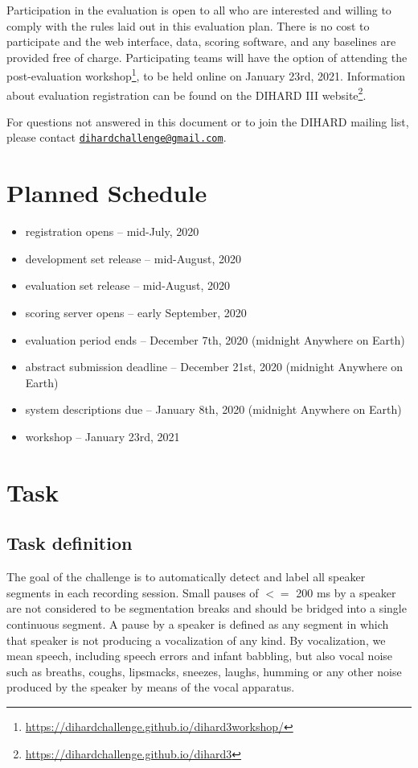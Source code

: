 \documentclass{article}
\newcommand{\email}[1]{\href{mailto:#1}{\nolinkurl{#1}}}
\begin{document}
Participation in the evaluation is open to all who are interested and willing to comply with the rules laid out in this evaluation plan. There is no cost to participate and the web interface, data, scoring software, and any baselines are provided free of charge. Participating teams will have the option of attending the post-evaluation workshop\footnote{\url{https://dihardchallenge.github.io/dihard3workshop/}}, to be held online on January 23rd, 2021. Information about evaluation registration can be found on the DIHARD III website\footnote{\url{https://dihardchallenge.github.io/dihard3}}.

For questions not answered in this document or to join the DIHARD mailing list, please contact \email{dihardchallenge@gmail.com}. 
    
    
    
    
    
    
    
\section{Planned Schedule}
\label{sec:schedule}
	\begin{itemize}
        \item registration opens  -- mid-July, 2020
    	\item development set release  --  mid-August, 2020
    	\item evaluation set release  --  mid-August, 2020
    	\item scoring server opens  --  early September, 2020
    	\item evaluation period ends  --  December 7th, 2020 (midnight Anywhere on Earth)
    	\item abstract submission deadline  --  December 21st, 2020 (midnight Anywhere on Earth)
    	\item system descriptions due  --  January 8th, 2020 (midnight Anywhere on Earth)
    	\item workshop  --  January 23rd, 2021
    \end{itemize}

    

\section{Task}
\subsection{Task definition}
The goal of the challenge is to automatically detect and label all speaker segments in each recording session. Small pauses of $<=$ 200 ms by a speaker are not considered to be segmentation breaks and should be bridged into a single continuous segment. A pause by a speaker is defined as any segment in which that speaker is not producing a vocalization of any kind. By vocalization, we mean speech, including speech errors and infant babbling, but also vocal noise such as breaths, coughs, lipsmacks, sneezes, laughs, humming or any other noise produced by the speaker by means of the vocal apparatus.
\end{document}
